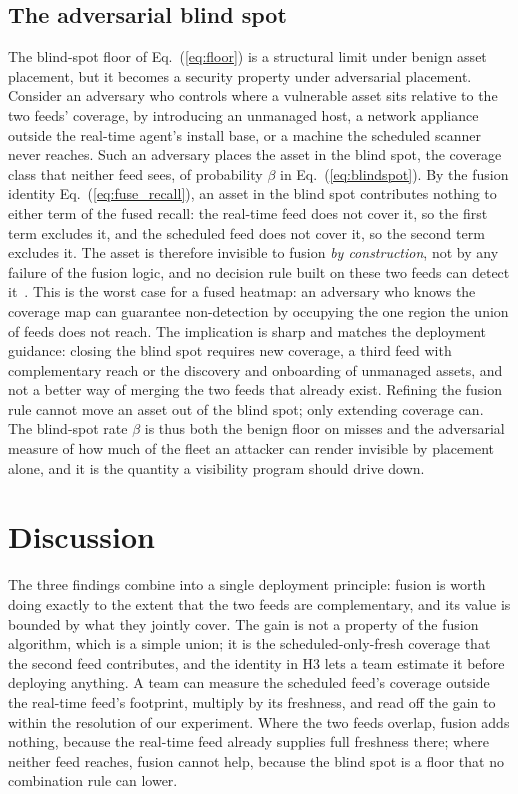 \documentclass[journal]{IEEEtran}
\begin{document}
\subsection{The adversarial blind spot}
The blind-spot floor of Eq.~(\ref{eq:floor}) is a structural limit under benign asset placement, but
it becomes a security property under adversarial placement. Consider an adversary who controls where
a vulnerable asset sits relative to the two feeds' coverage, by introducing an unmanaged host, a
network appliance outside the real-time agent's install base, or a machine the scheduled scanner
never reaches. Such an adversary places the asset in the blind spot, the coverage class that neither
feed sees, of probability $\beta$ in Eq.~(\ref{eq:blindspot}). By the fusion identity
Eq.~(\ref{eq:fuse_recall}), an asset in the blind spot contributes nothing to either term of the
fused recall: the real-time feed does not cover it, so the first term excludes it, and the scheduled
feed does not cover it, so the second term excludes it. The asset is therefore invisible to fusion
\emph{by construction}, not by any failure of the fusion logic, and no decision rule built on these
two feeds can detect it~\cite{cover2006elements}. This is the worst case for a fused heatmap: an
adversary who knows the coverage map can guarantee non-detection by occupying the one region the
union of feeds does not reach. The implication is sharp and matches the deployment guidance:
closing the blind spot requires new coverage, a third feed with complementary reach or the discovery
and onboarding of unmanaged assets, and not a better way of merging the two feeds that already
exist. Refining the fusion rule cannot move an asset out of the blind spot; only extending coverage
can. The blind-spot rate $\beta$ is thus both the benign floor on misses and the adversarial measure
of how much of the fleet an attacker can render invisible by placement alone, and it is the quantity
a visibility program should drive down.

\section{Discussion}
The three findings combine into a single deployment principle: fusion is worth doing exactly to the
extent that the two feeds are complementary, and its value is bounded by what they jointly cover.
The gain is not a property of the fusion algorithm, which is a simple union; it is the
scheduled-only-fresh coverage that the second feed contributes, and the identity in H3 lets a team
estimate it before deploying anything. A team can measure the scheduled feed's coverage outside the
real-time feed's footprint, multiply by its freshness, and read off the gain to within the
resolution of our experiment. Where the two feeds overlap, fusion adds nothing, because the
real-time feed already supplies full freshness there; where neither feed reaches, fusion cannot
help, because the blind spot is a floor that no combination rule can lower.
\end{document}
